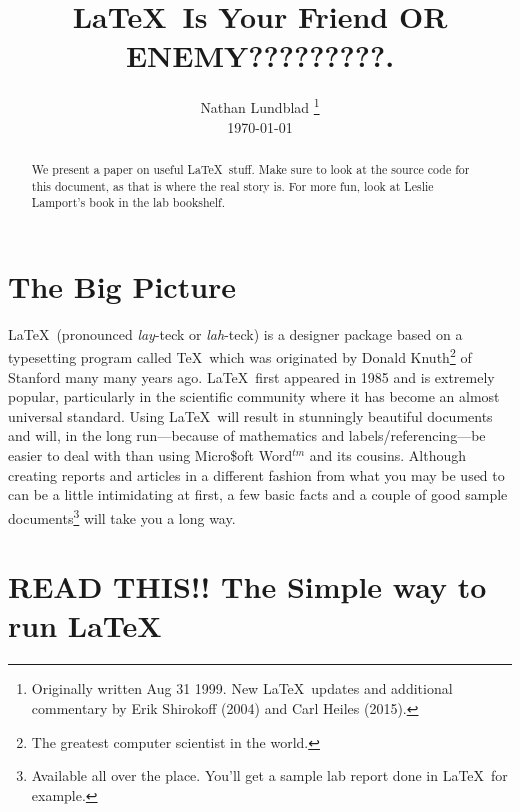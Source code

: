 \documentclass[12pt,preprint]{aastex}
\begin{document}
\title{\LaTeX\ Is Your Friend OR ENEMY?????????.}

\author{Nathan Lundblad \footnote{Originally written Aug 31 1999. New 
\LaTeX\ updates and additional commentary by Erik
Shirokoff (2004) and Carl Heiles (2015).} \\ \today}

\begin{abstract} We present a paper on useful \LaTeX\ stuff.  Make sure
to look at the source code for this document, as that is where the real
story is.  For more fun, look at Leslie Lamport's book in the lab
bookshelf.  \end{abstract}

\tableofcontents

\section{The Big Picture}\label{bigpicsec} %

        \LaTeX\ (pronounced {\it lay}-teck or {\it lah}-teck) is a
designer package based on a typesetting program called \TeX\, which was
originated by Donald Knuth\footnote{The greatest computer scientist in
the world.} of Stanford many many years ago.  \LaTeX\ first appeared in
1985 and is extremely popular, particularly in the scientific community
where it has become an almost universal standard.  Using \LaTeX\ will
result in stunningly beautiful documents and will, in the long
run---because of mathematics and labels/referencing---be easier to deal
with than using Micro\$oft Word$^{tm}$ and its cousins.  Although
creating reports and articles in a different fashion from what you may
be used to can be a little intimidating at first, a few basic facts and
a couple of good sample documents\footnote{Available all over the place.
You'll get a sample lab report done in \LaTeX\, for example.  } will
take you a long way.

\section{READ THIS!! The Simple way to run \LaTeX\ }
\end{document}
